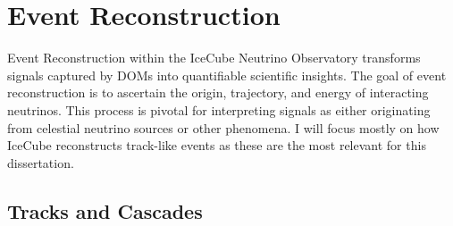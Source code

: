 \section{Event Reconstruction}
Event Reconstruction within the IceCube Neutrino Observatory transforms signals captured by DOMs into quantifiable scientific insights.
The goal of event reconstruction is to ascertain the origin, trajectory, and energy of interacting neutrinos.
This process is pivotal for interpreting signals as either originating from celestial neutrino sources or other phenomena.
I will focus mostly on how IceCube reconstructs track-like events as these are the most relevant for this dissertation.

\subsection{Tracks and Cascades}

